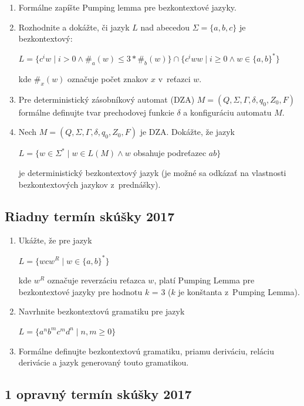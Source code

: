 \documentclass[11pt,a4paper]{article}
\begin{document}
		\begin{enumerate}
			\item Formálne zapíšte Pumping lemma pre bezkontextové jazyky.

			\item Rozhodnite a dokážte, či jazyk $L$ nad abecedou $\Sigma = \{a,b,c\}$ je bezkontextový:
	
			$L = \{c^iw \mid i > 0 \land \#_a(w) \leq 3 * \#_b(w)\} \cap \{c^iww \mid i \geq 0 \land w \in \{a,b\}^*\}$
	
			kde $\#_x(w)$ označuje počet znakov $x$ v~reťazci $w$.
	
			\item Pre deterministický zásobníkový automat (DZA) $M = (Q, \Sigma, \Gamma, \delta, q_0, Z_0, F)$ formálne definujte tvar prechodovej funkcie $\delta$ a konfiguráciu automatu $M$.
	
			\item Nech $M = (Q, \Sigma, \Gamma, \delta, q_0, Z_0, F)$ je DZA. Dokážte, že jazyk
	
			$L = \{w \in \Sigma^* \mid w \in L(M) \land w$ obsahuje podreťazec $ab\}$
	
			je deterministický bezkontextový jazyk (je možné sa odkázať na vlastnosti bezkontextových jazykov z~prednášky).
		\end{enumerate}

		\subsection{Riadny termín skúšky 2017}

		\begin{enumerate}
			\item Ukážte, že pre jazyk

			$L = \{wcw^R \mid w \in \{a,b\}^*\}$
	
			kde $w^R$ označuje reverzáciu reťazca $w$, platí Pumping Lemma pre bezkontextové jazyky pre hodnotu $k$ = 3 ($k$ je konštanta z~Pumping Lemma).
	
			\item Navrhnite bezkontextovú gramatiku pre jazyk
	
			$L = \{a^nb^mc^md^n \mid n,m \geq 0\}$
	
			\item Formálne definujte bezkontextovú gramatiku, priamu deriváciu, reláciu derivácie a jazyk generovaný touto gramatikou.
		\end{enumerate}

		\subsection{1 opravný termín skúšky 2017}
\end{document}
